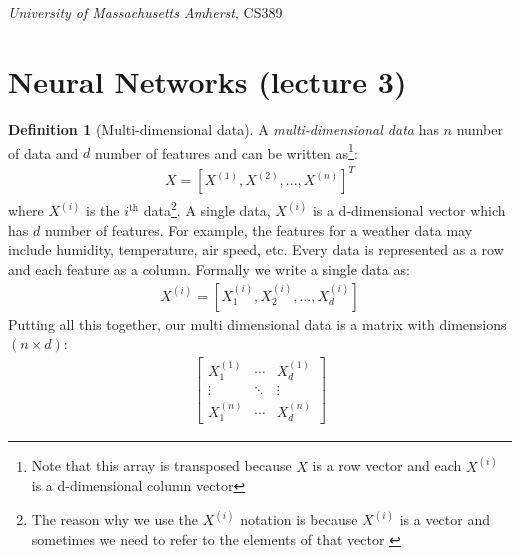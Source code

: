 \documentclass[11pt]{article}
\numberwithin{equation}{section}
\theoremstyle{definition}%
\newtheorem{definition}{Definition}[section]%
\begin{document}
\noindent
\begin{center}
    \section*{}
    \subsection*{}
    \emph{University of Massachusetts Amherst}, CS389
\end{center}

\section{Neural Networks (lecture 3)}

\begin{definition}[Multi-dimensional data] A \emph{multi-dimensional data} has $n$ number of data and $d$ number of features and can be written as\footnote{Note that this array is transposed because $X$ is a row vector and each $X^{(i)}$ is a d-dimensional column vector}:
    \begin{align}
        X = \left [ X^{(1)}, X^{(2)}, ..., X^{(n)} \right ]^{T}
    \end{align}
where $X^{(i)}$ is the $i^{\text{th}}$ data\footnote{The reason why we use the $X^{(i)}$ notation is because $X^{(i)}$ is a vector and sometimes we need to refer to the elements of that vector \cite{MIT}}. A single data, $X^{(i)}$ is a d-dimensional vector which has $d$ number of features. For example, the features for a weather data may include humidity, temperature, air speed, etc. Every data is represented as a row and each feature as a column. Formally we write a single data as:
    \begin{align}
        X^{(i)} = \left [ X_{1}^{(i)}, X_{2}^{(i)}, ..., X_{d}^{(i)} \right ]
    \end{align}
Putting all this together, our multi dimensional data is a matrix with dimensions $(n \times d)$:
    \begin{align}
        \begin{bmatrix}
            X_{1}^{(1)} & \cdots & X_{d}^{(1)} \\
            \vdots & \ddots & \vdots \\
            X_{1}^{(n)} & \cdots & X_{d}^{(n)} 
        \end{bmatrix}
    \end{align}


\end{definition}
\end{document}
